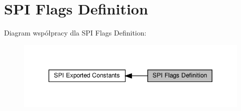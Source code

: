 \hypertarget{group___s_p_i___flags__definition}{}\section{S\+PI Flags Definition}
\label{group___s_p_i___flags__definition}
Diagram współpracy dla S\+PI Flags Definition\+:\nopagebreak
\begin{figure}[H]
\begin{center}
\leavevmode
\includegraphics[width=343pt]{group___s_p_i___flags__definition}
\end{center}
\end{figure}
